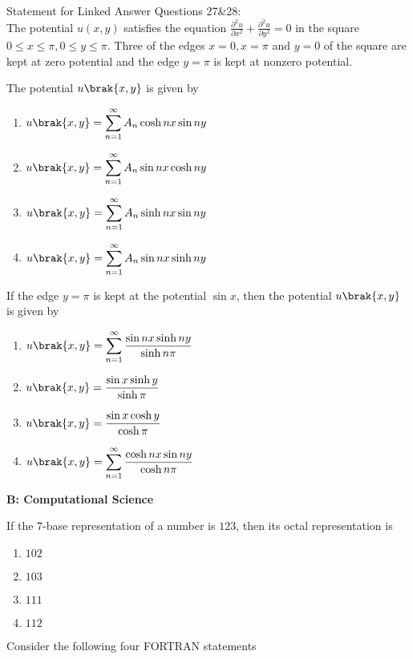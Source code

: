     Statement for Linked Answer Questions 27\&28:\\
    The potential $u(x,y)$ satisfies the equation $\displaystyle\frac{\partial^2u}{\partial x^2}+\frac{\partial^2u}{\partial y^2}=0$ in the square $0\leq x\leq\pi, 0\leq y\leq\pi$. Three of the edges $x=0,x=\pi$ and $y=0$ of the square are kept at zero potential and the edge $y=\pi$ is kept at nonzero potential.\\

    \item The potential $u\brak{x,y}$ is given by
    \begin{enumerate}
        \item $u\brak{x,y}=\displaystyle\sum_{n=1}^{\infty}A_n \cosh{nx}\sin{ny}$
        \item $u\brak{x,y}=\displaystyle\sum_{n=1}^{\infty}A_n \sin{nx}\cosh{ny}$
        \item $u\brak{x,y}=\displaystyle\sum_{n=1}^{\infty}A_n \sinh{nx}\sin{ny}$
        \item $u\brak{x,y}=\displaystyle\sum_{n=1}^{\infty}A_n \sin{nx}\sinh{ny}$
    \end{enumerate}
    \item If the edge $y=\pi$ is kept at the potential $\sin{x}$, then the potential $u\brak{x,y}$ is given by
    \begin{enumerate}
        \item $u\brak{x,y}=\displaystyle\sum_{n=1}^{\infty}\frac{\sin{nx}\sinh{ny}}{\sinh{n\pi}}$
        \item $u\brak{x,y}=\displaystyle\frac{\sin{x}\sinh{y}}{\sinh{\pi}}$
        \item $u\brak{x,y}=\displaystyle\frac{\sin{x}\cosh{y}}{\cosh{\pi}}$
        \item $u\brak{x,y}=\displaystyle\sum_{n=1}^{\infty}\frac{\cosh{nx}\sin{ny}}{\cosh{n\pi}}$
    \end{enumerate}
\vspace{0.5cm}
\textbf{B: Computational Science}\\
    \item If the $7$-base representation of a number is $123$, then its octal representation is
    \begin{enumerate}
        \item $102$
        \item $103$
        \item $111$
        \item $112$
    \end{enumerate}
    \item Consider the following four FORTRAN statements 
